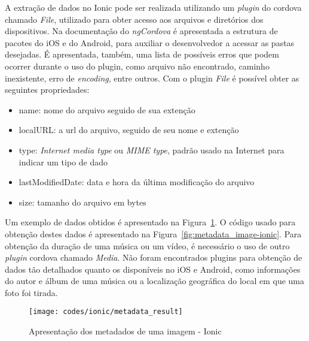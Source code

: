 
A extração de dados no Ionic pode ser realizada utilizando um \textit{plugin} do cordova chamado \textit{File}, utilizado para obter 
acesso aos arquivos e diretórios dos dispositivos. Na documentação do \textit{ngCordova} é apresentada a estrutura de pacotes do iOS e 
do Android, para auxiliar o desenvolvedor a acessar as pastas desejadas. É apresentada, também, uma lista de possíveis erros
que podem ocorrer durante o uso do plugin, como arquivo não encontrado, caminho inexistente, erro de \textit{encoding}, entre outros.
Com o plugin \textit{File} é possível obter as seguintes propriedades:
 
\begin{itemize}
	\item name: nome do arquivo seguido de sua extenção
	\item localURL: a url do arquivo, seguido de seu nome e extenção
	\item type: \textit{Internet media type} ou \textit{MIME type}, padrão usado na Internet para indicar um tipo de dado
	\item lastModifiedDate: data e hora da última modificação do arquivo
	\item size: tamanho do arquivo em bytes
\end{itemize}

Um exemplo de dados obtidos é apresentado na Figura~\ref{fig:metadata_result-ionic}. O código usado para 
obtenção destes dados é apresentado na Figura~\ref{fig:metadata_image-ionic}.
Para obtenção da duração de uma música ou um vídeo, é necessário o uso de outro  \textit{plugin} cordova chamado \textit{Media}.
Não foram encontrados plugins para obtenção de dados tão detalhados quanto os disponíveis no iOS e Android, como informações do autor 
e álbum de uma música ou a localização geográfica do local em que uma foto foi tirada.

\begin{figure}[H]
	\centering
	\texttt{[image: codes/ionic/metadata\_result]}
	\caption[Apresentação dos metadados de uma imagem - Ionic]{Apresentação dos metadados de uma imagem - Ionic}
	\label{fig:metadata_result-ionic}
\end{figure}

